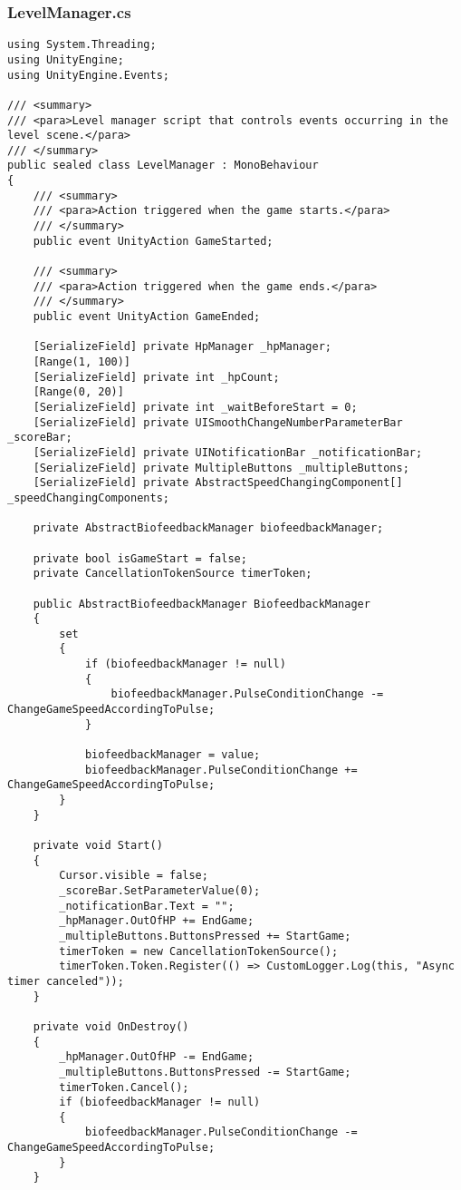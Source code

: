 \subsubsection*{LevelManager.cs}
\begin{verbatim}
using System.Threading;
using UnityEngine;
using UnityEngine.Events;

/// <summary>
/// <para>Level manager script that controls events occurring in the level scene.</para>
/// </summary>
public sealed class LevelManager : MonoBehaviour
{
    /// <summary>
    /// <para>Action triggered when the game starts.</para>
    /// </summary>
    public event UnityAction GameStarted;

    /// <summary>
    /// <para>Action triggered when the game ends.</para>
    /// </summary>
    public event UnityAction GameEnded;

    [SerializeField] private HpManager _hpManager;
    [Range(1, 100)] 
    [SerializeField] private int _hpCount;
    [Range(0, 20)]
    [SerializeField] private int _waitBeforeStart = 0;
    [SerializeField] private UISmoothChangeNumberParameterBar _scoreBar;
    [SerializeField] private UINotificationBar _notificationBar;
    [SerializeField] private MultipleButtons _multipleButtons;
    [SerializeField] private AbstractSpeedChangingComponent[] _speedChangingComponents;
    
    private AbstractBiofeedbackManager biofeedbackManager;

    private bool isGameStart = false;
    private CancellationTokenSource timerToken;

    public AbstractBiofeedbackManager BiofeedbackManager
    {
        set
        {
            if (biofeedbackManager != null)
            {
                biofeedbackManager.PulseConditionChange -= ChangeGameSpeedAccordingToPulse;
            }

            biofeedbackManager = value;
            biofeedbackManager.PulseConditionChange += ChangeGameSpeedAccordingToPulse;
        }
    }

    private void Start()
    {
        Cursor.visible = false;
        _scoreBar.SetParameterValue(0);
        _notificationBar.Text = "";
        _hpManager.OutOfHP += EndGame;
        _multipleButtons.ButtonsPressed += StartGame;
        timerToken = new CancellationTokenSource();
        timerToken.Token.Register(() => CustomLogger.Log(this, "Async timer canceled"));
    }

    private void OnDestroy()
    {
        _hpManager.OutOfHP -= EndGame;
        _multipleButtons.ButtonsPressed -= StartGame;
        timerToken.Cancel();
        if (biofeedbackManager != null)
        {
            biofeedbackManager.PulseConditionChange -= ChangeGameSpeedAccordingToPulse;
        }
    }


\end{verbatim}
